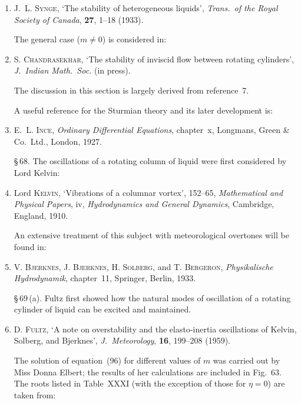 \begin{enumerate}
\medskip
\noindent\S\,67.  The analytical derivation of Rayleigh's criterion (for the case $m = 0$)
is due to:

\item J.~L. \textsc{Synge}, `The stability of heterogeneous liquids', \textit{Trans.\ of the Royal
Society of Canada}, \textbf{27}, 1--18 (1933).

\noindent The general case ($m \neq 0$) is considered in:

\item S. \textsc{Chandrasekhar}, `The stability of inviscid flow between rotating
cylinders', \textit{J.\ Indian Math.\ Soc.} (in press).

\noindent The discussion in this section is largely derived from reference~7.

\noindent A useful reference for the Sturmian theory and its later development is:

\item E.~L. \textsc{Ince}, \textit{Ordinary Differential Equations}, chapter~x, Longmans, Green \&
Co.\ Ltd., London, 1927.

\medskip
\noindent\S\,68.  The oscillations of a rotating column of liquid were first considered by
Lord Kelvin:

\item Lord \textsc{Kelvin}, `Vibrations of a columnar vortex', 152--65, \textit{Mathematical
and Physical Papers}, iv, \textit{Hydrodynamics and General Dynamics}, Cambridge,
England, 1910.

\noindent An extensive treatment of this subject with meteorological overtones will be
found in:

\item V. \textsc{Bjerknes}, J. \textsc{Bjerknes}, H. \textsc{Solberg}, and T. \textsc{Bergeron}, \textit{Physikalische
Hydrodynamik}, chapter~11, Springer, Berlin, 1933.

\medskip
\noindent\S\,69\,(a).  Fultz first showed how the natural modes of oscillation of a rotating
cylinder of liquid can be excited and maintained.

\item D. \textsc{Fultz}, `A note on overstability and the elasto-inertia oscillations of
Kelvin, Solberg, and Bjerknes', \textit{J.\ Meteorology}, \textbf{16}, 199--208 (1959).

\noindent The solution of equation~(96) for different values of $m$ was carried out by Miss
Donna Elbert; the results of her calculations are included in Fig.~63.
The roots listed in Table~XXXI (with the exception of those for $\eta = 0$) are taken
from:


\end{enumerate}
